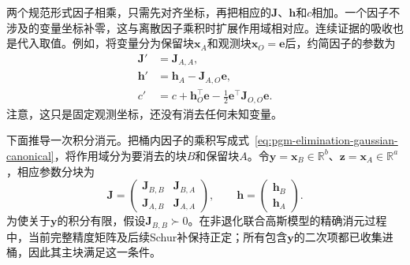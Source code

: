 两个规范形式因子相乘，只需先对齐坐标，再把相应的$\bm{J}$、$\bm{h}$和$c$相加。一个因子不涉及的变量坐标补零，这与离散因子乘积时扩展作用域相对应。连续证据的吸收也是代入取值。例如，将变量分为保留块$\bm{x}_A$和观测块$\bm{x}_O=\bm{e}$后，约简因子的参数为
\[
  \begin{aligned}
    \bm{J}'&=\bm{J}_{A,A},\\
    \bm{h}'&=\bm{h}_A-\bm{J}_{A,O}\bm{e},\\
    c'&=c+\bm{h}_O^{\top}\bm{e}
       -\frac12\bm{e}^{\top}\bm{J}_{O,O}\bm{e}.
  \end{aligned}
\]
注意，这只是固定观测坐标，还没有消去任何未知变量。

下面推导一次积分消元。把桶内因子的乘积写成式~\eqref{eq:pgm-elimination-gaussian-canonical}，将作用域分为要消去的块$B$和保留块$A$。令$\bm{y}=\bm{x}_B\in\mathbb{R}^{b}$、$\bm{z}=\bm{x}_A\in\mathbb{R}^{a}$，相应参数分块为
\[
  \bm{J}=
  \begin{pmatrix}
    \bm{J}_{B,B}&\bm{J}_{B,A}\\
    \bm{J}_{A,B}&\bm{J}_{A,A}
  \end{pmatrix},
  \qquad
  \bm{h}=
  \begin{pmatrix}\bm{h}_B\\\bm{h}_A\end{pmatrix}.
\]
为使关于$\bm{y}$的积分有限，假设$\bm{J}_{B,B}\succ0$。在非退化联合高斯模型的精确消元过程中，当前完整精度矩阵及后续Schur补保持正定；所有包含$\bm{y}$的二次项都已收集进桶，因此其主块满足这一条件。

